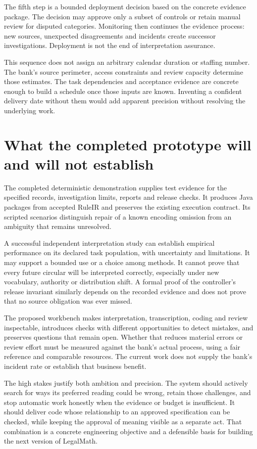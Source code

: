 The fifth step is a bounded deployment decision based on the concrete evidence
package. The decision may approve only a subset of controls or retain manual
review for disputed categories. Monitoring then continues the evidence process:
new sources, unexpected disagreements and incidents create successor
investigations. Deployment is not the end of interpretation assurance.

This sequence does not assign an arbitrary calendar duration or staffing number.
The bank's source perimeter, access constraints and review capacity determine
those estimates. The task dependencies and acceptance evidence are concrete enough
to build a schedule once those inputs are known. Inventing a confident delivery
date without them would add apparent precision without resolving the underlying
work.

\section{What the completed prototype will and will not establish}
\label{merge:M10:15}


The completed deterministic demonstration supplies test evidence for
the specified records, investigation limits, reports and release checks.
It produces Java packages from accepted RuleIR and preserves the existing
execution contract. Its scripted scenarios distinguish repair of a known
encoding omission from an ambiguity that remains unresolved.

A successful independent interpretation study can establish empirical performance
on its declared task population, with uncertainty and limitations. It may support
a bounded use or a choice among methods. It cannot prove that every future
circular will be interpreted correctly, especially under new vocabulary,
authority or distribution shift. A formal proof of the controller's release
invariant similarly depends on the recorded evidence and does not prove that no
source obligation was ever missed.


The proposed workbench makes interpretation, transcription, coding and review
inspectable, introduces checks with different opportunities to detect mistakes,
and preserves questions that remain open. Whether that reduces material errors
or review effort must be measured against the bank's actual process, using a
fair reference and comparable resources. The current work does not supply the
bank's incident rate or establish that business benefit.

The high stakes justify both ambition and precision. The system should actively
search for ways its preferred reading could be wrong, retain those challenges,
and stop automatic work honestly when the evidence or budget is insufficient.
It should deliver code whose relationship to an approved specification can be
checked, while keeping the approval of meaning visible as a separate act.
That combination is a concrete engineering objective and a defensible basis for
building the next version of LegalMath.
